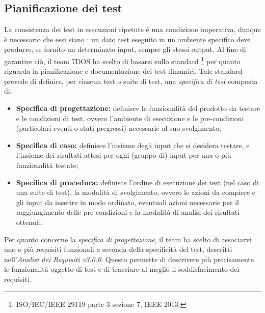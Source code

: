 \subsection{Pianificazione dei test}
La consistenza dei test in esecuzioni ripetute è una condizione imperativa, dunque è necessario che essi siano : un dato test eseguito in un ambiente specifico deve produrre, se fornito un determinato input, sempre gli stessi output. Al fine di garantire ciò, il team 7DOS ha scelto di basarsi sullo standard \footnote{ISO/IEC/IEEE 29119 parte 3 sezione 7, IEEE 2013.} per quanto riguarda la pianificazione e documentazione dei test dinamici. Tale standard prevede di definire, per ciascun test o suite di test, una \emph{specifica di test} composta di:
\begin{itemize}
	\item {\textbf{Specifica di progettazione:} definisce le funzionalità del prodotto da testare e le condizioni di test, ovvero l'ambiente di esecuzione e le pre-condizioni (particolari eventi o stati pregressi) necessarie al suo svolgimento;}
	\item {\textbf{Specifica di caso:} definisce l'insieme degli input che si desidera testare, e l'insieme dei risultati attesi per ogni (gruppo di) input per una o più funzionalità testate;}
	\item {\textbf{Specifica di procedura:} definisce l'ordine di esecuzione dei test (nel caso di una suite di test), la modalità di svolgimento, ovvero le azioni da compiere e gli input da inserire in modo ordinato, eventuali azioni necessarie per il raggiungimento delle pre-condizioni e la modalità di analisi dei risultati ottenuti.}
\end{itemize}

Per quanto concerne la \emph{specifica di progettazione}, il team ha scelto di associarvi uno o più requisiti funzionali a seconda della specificità del test, descritti nell'\emph{Analisi dei Requisiti v3.0.0}. Questo permette di descrivere più precisamente le funzionalità oggetto di test e di tracciare al meglio il soddisfacimento dei requisiti. \\


